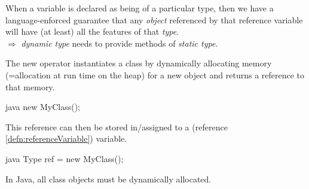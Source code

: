 \begin{corbox}\nospacing
  \begin{cor}
    When a variable is declared as being of a particular type, then we have a
    language-enforced guarantee that any \textit{object} referenced by that
    reference variable will have (at least) all the features of that
    \textit{type}.\\
    $\Rightarrow$ \textit{dynamic type} needs to provide methods of \textit{static type}.
  \end{cor}  
\end{corbox}
\begin{defnbox}\nospacing
  \begin{defn}
    The new operator instantiates a class by dynamically allocating memory (=allocation at run time on the heap)
    for a new object and returns a reference to that memory.
    \begin{mintlinebox}{java}
      new MyClass();
    \end{mintlinebox}
    This reference can then be stored in/assigned to a (reference \cref{defn:referenceVariable}) variable.
    \begin{mintlinebox}{java}
      Type ref = new MyClass();
    \end{mintlinebox}
  \end{defn}
\end{defnbox}
\begin{notebox}[Note]\nospacing
  In Java, all class objects must be dynamically allocated.
\end{notebox}
